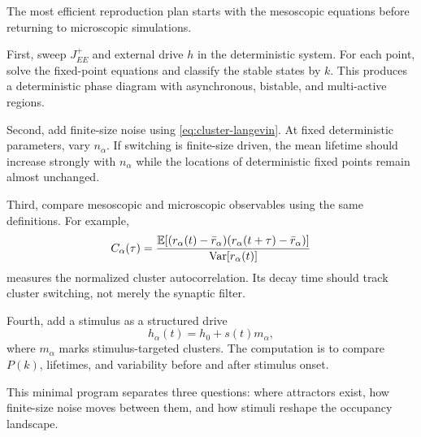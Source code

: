 The most efficient reproduction plan starts with the mesoscopic equations before returning to microscopic simulations.

First, sweep $J_{EE}^{+}$ and external drive $h$ in the deterministic system. For each point, solve the fixed-point equations and classify the stable states by $k$. This produces a deterministic phase diagram with asynchronous, bistable, and multi-active regions.

Second, add finite-size noise using \eqref{eq:cluster-langevin}. At fixed deterministic parameters, vary $n_{\alpha}$. If switching is finite-size driven, the mean lifetime should increase strongly with $n_{\alpha}$ while the locations of deterministic fixed points remain almost unchanged.

Third, compare mesoscopic and microscopic observables using the same definitions. For example,
%
\begin{equation}
  C_{\alpha}(\tau)
  =
  \frac{
    \mathbb{E}[(r_{\alpha}(t)-\bar r_{\alpha})(r_{\alpha}(t+\tau)-\bar r_{\alpha})]
  }{
    \operatorname{Var}[r_{\alpha}(t)]
  }
  \label{eq:ch10-cluster-autocorrelation}
\end{equation}
%
measures the normalized cluster autocorrelation. Its decay time should track cluster switching, not merely the synaptic filter.

Fourth, add a stimulus as a structured drive
%
\begin{equation}
  h_{\alpha}(t)
  =
  h_0 + s(t)m_{\alpha},
  \label{eq:structured-stimulus-drive}
\end{equation}
%
where $m_{\alpha}$ marks stimulus-targeted clusters. The computation is to compare $P(k)$, lifetimes, and variability before and after stimulus onset.

This minimal program separates three questions: where attractors exist, how finite-size noise moves between them, and how stimuli reshape the occupancy landscape.

